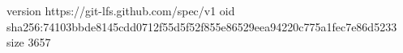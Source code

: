 version https://git-lfs.github.com/spec/v1
oid sha256:74103bbde8145cdd0712f55d5f52f855e86529eea94220c775a1fec7e86d5233
size 3657
